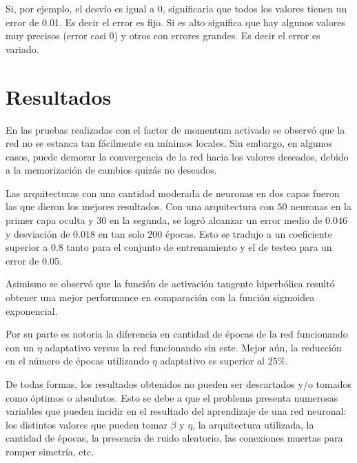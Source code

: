\documentclass[%
    final,
    reprint,
    notitlepage,
    narroweqnarray,
    inline,
    twoside,
    invited
    ]{ieee}
\begin{document}
Si, por ejemplo, el desvío es igual a 0, significaría que todos los valores tienen un error de
0.01. Es decir el error es fijo. Si es alto significa que hay algunos valores muy precisos (error casi 0) y otros con errores grandes. Es decir el error es variado.

\section{Resultados}

\par En las pruebas realizadas con el factor de momentum activado se observó que la red no se estanca tan fácilmente en mínimos locales. Sin embargo, en algunos casos, puede demorar la convergencia de la red hacia los valores deseados, 
debido a la memorización de cambios quizás no deseados.\\

\par Las arquitecturas con una cantidad moderada de neuronas en dos capas fueron las que dieron los 
mejores resultados. 
Con una arquitectura con $50$ neuronas en la primer capa oculta y $30$ en la segunda, se logró alcanzar un error medio de 
$0.046$ y desviación de $0.018$ en tan solo 200 épocas. Esto se tradujo a un coeficiente superior a $0.8$ tanto para el conjunto de entrenamiento 
y el de testeo para un error de $0.05$.

\par Asimismo se observó que la función de activación tangente hiperbólica resultó obtener una mejor performance en comparación con la función sigmoidea exponencial.

\par Por su parte es notoria la diferencia en cantidad de épocas de la red funcionando con un $\eta$ adaptativo versus la red funcionando sin este. Mejor aún, la reducción en el número de épocas utilizando $\eta$ adaptativo es superior al $25\%$.\\

\par De todas formas, los resultados obtenidos no pueden ser descartados y/o tomados como óptimos o 
absulutos. Esto se debe a que el problema presenta numerosas variables 
que pueden incidir en el resultado del aprendizaje de una red neuronal: 
los distintos valores que pueden tomar $\beta$ y $\eta$, la arquitectura utilizada, 
la cantidad de épocas, la presencia de ruido aleatorio, las conexiones muertas para romper simetría, etc.\\
\end{document}
